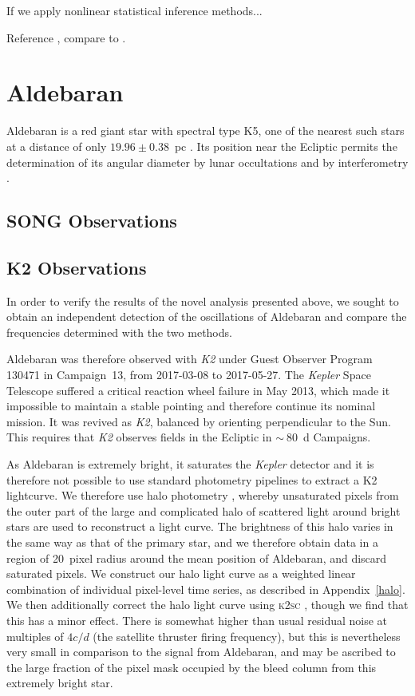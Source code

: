 \documentclass[modern]{aastex61}
\newcommand{\kepler}{\emph{Kepler}\xspace}
\newcommand{\ktwo}{\emph{K2}\xspace}
\begin{document}
If we apply nonlinear statistical inference methods...

Reference \citet{Kelly2014}, compare to \citet{Foreman-Mackey2017}.

\section{Aldebaran}
Aldebaran is a red giant star with spectral type K5, one of the nearest such stars at a distance of only $19.96 \pm 0.38$~pc \citep{hipparcos}. Its position near the Ecliptic permits the determination of its angular diameter by lunar occultations and by interferometry \citep[$20.58 \pm 0.03$ mas;][]{richichi2005,1979ApJ...228L.111B,brown1979,panek1980}.

\subsection{SONG Observations}

\subsection{K2 Observations}

In order to verify the results of the novel analysis presented above, we sought to obtain an independent detection of the oscillations of Aldebaran and compare the frequencies determined with the two methods. 

Aldebaran was therefore observed with \ktwo under Guest Observer Program 130471 in Campaign~13, from 2017-03-08 to 2017-05-27. The \kepler Space Telescope \citep{2010sci...327..977b}  
suffered a critical reaction wheel failure in May 2013, which made it impossible to maintain a stable pointing and therefore continue its nominal mission. It was revived as \ktwo \citep{howell14}, balanced by orienting perpendicular to the Sun. This requires that \ktwo observes fields in the Ecliptic in $\sim~80$~d Campaigns. 

As Aldebaran is extremely bright, it saturates the \kepler detector and it is therefore not possible to use standard photometry pipelines to extract a K2 lightcurve. We therefore use halo photometry \citep[as originally implemented in]{White2017}, whereby unsaturated pixels from the outer part of the large and complicated halo of scattered light around bright stars are used to reconstruct a light curve. The brightness of this halo varies in the same way as that of the primary star, and we therefore obtain data in a region of 20~pixel radius around the mean position of Aldebaran, and discard saturated pixels. We construct our halo light curve as a weighted linear combination of individual pixel-level time series, as described in Appendix~\ref{halo}. We then additionally correct the halo light curve using \textsc{k2sc} \citep{k2sc}, though we find that this has a minor effect. There is somewhat higher than usual residual noise at multiples of $4 c/d$ (the satellite thruster firing frequency), but this is nevertheless very small in comparison to the signal from Aldebaran, and may be ascribed to the large fraction of the pixel mask occupied by the bleed column from this extremely bright star.
\end{document}
